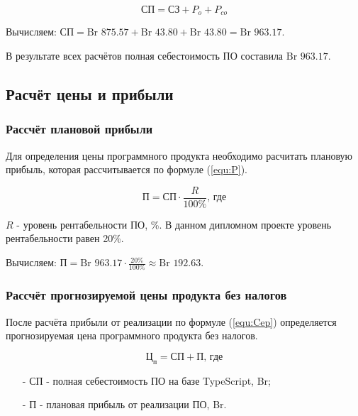\begin{equation}
    \label{equ:SP}
    \text{СП} = \text{СЗ} + P_o + P_{co}
\end{equation}

Вычисляем: $\text{СП} = \text{Br }875.57 + \text{Br }43.80 + \text{Br }43.80 = \text{Br }963.17$.

В результате всех расчётов полная себестоимость ПО составила $\text{Br }963.17$.

\subsection{Расчёт цены и прибыли}

\subsubsection*{Рассчёт плановой прибыли}

Для определения цены программного продукта необходимо расчитать плановую прибыль, которая рассчитывается по формуле (\ref{equ:P}).

\begin{equation}
    \label{equ:P}
    \text{П} = \text{СП} \cdot \frac{ R }{ 100\% } \text{, где}
\end{equation}

$R$ - уровень рентабельности ПО, \%. В данном дипломном проекте уровень рентабельности равен 20\%.

Вычисляем: $\text{П} = \text{Br }963.17 \cdot \frac{ 20\% }{ 100\% } \approx \text{Br }192.63$.

\subsubsection*{Рассчёт прогнозируемой цены продукта без налогов}

После расчёта прибыли от реализации по формуле (\ref{equ:Cep}) определяется прогнозируемая цена программного продукта без налогов.

\begin{equation}
    \label{equ:Cep}
    \text{Ц}_\text{п} = \text{СП} + \text{П} \text{, где}
\end{equation}

\begin{enumerate}
    \item[-] $\text{СП}$ - полная себестоимость ПО на базе TypeScript, Br;
    \item[-] $\text{П}$ - плановая прибыль от реализации ПО, Br. 
\end{enumerate}

